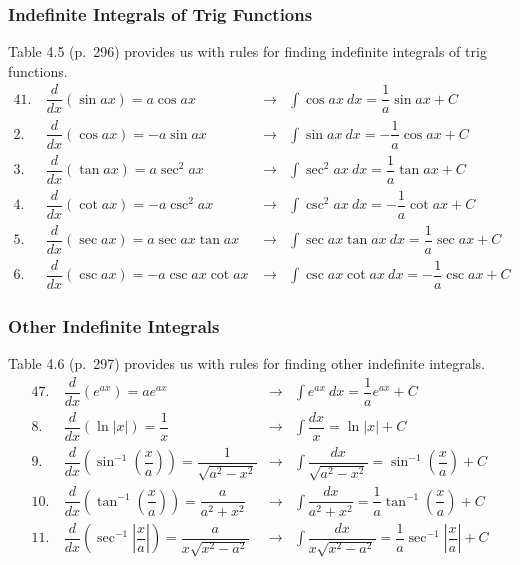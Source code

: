 \documentclass[14pt]{beamer}
\newcommand{\dint}{\displaystyle\int}
\begin{document}
\begin{frame}
\frametitle{\small Indefinite Integrals of Trig Functions}
\footnotesize
Table 4.5 (p.\ 296) provides us with rules for finding indefinite integrals of trig functions.
\begin{alignat*}{4}
1.\ &\dfrac{d}{dx} (\sin ax) = a\cos ax &\longrightarrow &\dint \cos ax\ dx = \dfrac{1}{a} \sin ax + C \\
2.\ &\dfrac{d}{dx} (\cos ax) = -a\sin ax &\longrightarrow &\dint \sin ax\ dx = -\dfrac{1}{a} \cos ax + C \\
3.\ &\dfrac{d}{dx} (\tan ax) = a\sec^2 ax &\longrightarrow &\dint \sec^2 ax\ dx = \dfrac{1}{a} \tan ax + C \\
4.\ &\dfrac{d}{dx} (\cot ax) = -a\csc^2 ax &\longrightarrow &\dint \csc^2 ax\ dx = -\dfrac{1}{a} \cot ax + C \\
5.\ &\dfrac{d}{dx} (\sec ax) = a\sec ax \tan ax &\longrightarrow &\dint \sec ax \tan ax\ dx = \dfrac{1}{a} \sec ax + C \\
6.\ &\dfrac{d}{dx} (\csc ax) = -a\csc ax \cot ax \ &\longrightarrow &\dint \csc ax \cot ax\ dx = -\dfrac{1}{a} \csc ax + C
\end{alignat*}
\end{frame}

\begin{frame}
\frametitle{\small Other Indefinite Integrals}
\footnotesize
Table 4.6 (p.\ 297) provides us with rules for finding other indefinite integrals.
\begin{alignat*}{4}
7.\ &\dfrac{d}{dx} (e^{ax}) = a e^{ax} &\longrightarrow &\dint e^{ax}\ dx = \dfrac{1}{a} e^{ax} + C \\
8.\ &\dfrac{d}{dx} (\ln |x|) = \dfrac{1}{x} &\longrightarrow &\dint \dfrac{dx}{x} = \ln |x| + C \\
9.\ &\dfrac{d}{dx} \left( \sin^{-1} \left( \dfrac{x}{a} \right) \right) = \dfrac{1}{\sqrt{a^2-x^2}} &\longrightarrow 
&\dint \dfrac{dx}{\sqrt{a^2-x^2}} = \sin^{-1} \left( \dfrac{x}{a} \right) + C \\
10.\ &\dfrac{d}{dx} \left( \tan^{-1} \left( \dfrac{x}{a} \right) \right) = \dfrac{a}{a^2+x^2} &\longrightarrow 
&\dint \dfrac{dx}{a^2+x^2} = \dfrac{1}{a} \tan^{-1} \left( \dfrac{x}{a} \right) + C \\
11.\ &\dfrac{d}{dx} \left( \sec^{-1} \left| \dfrac{x}{a} \right| \right) = \dfrac{a}{x \sqrt{x^2-a^2}} &\longrightarrow 
&\dint \dfrac{dx}{x \sqrt{x^2-a^2}} = \dfrac{1}{a} \sec^{-1} \left| \dfrac{x}{a} \right| + C
\end{alignat*}
\end{frame}
\end{document}
